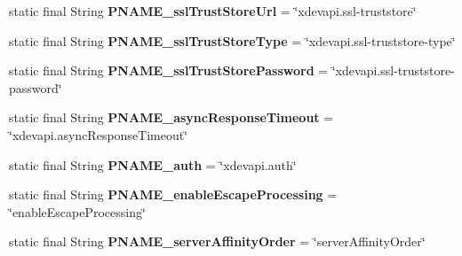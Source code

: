 \begin{DoxyCompactItemize}
static final String {\bfseries P\+N\+A\+M\+E\+\_\+ssl\+Trust\+Store\+Url} = \char`\"{}xdevapi.\+ssl-\/truststore\char`\"{}
\item 
\mbox{\label{classcom_1_1mysql_1_1cj_1_1conf_1_1_property_definitions_a1d4510674aaec9a522a0d45b6579f73d}} 
static final String {\bfseries P\+N\+A\+M\+E\+\_\+ssl\+Trust\+Store\+Type} = \char`\"{}xdevapi.\+ssl-\/truststore-\/type\char`\"{}
\item 
\mbox{\label{classcom_1_1mysql_1_1cj_1_1conf_1_1_property_definitions_a87623840b4eec648043fe571b884400e}} 
static final String {\bfseries P\+N\+A\+M\+E\+\_\+ssl\+Trust\+Store\+Password} = \char`\"{}xdevapi.\+ssl-\/truststore-\/password\char`\"{}
\item 
\mbox{\label{classcom_1_1mysql_1_1cj_1_1conf_1_1_property_definitions_abcca298bb61529133c71710af0003312}} 
static final String {\bfseries P\+N\+A\+M\+E\+\_\+async\+Response\+Timeout} = \char`\"{}xdevapi.\+async\+Response\+Timeout\char`\"{}
\item 
\mbox{\label{classcom_1_1mysql_1_1cj_1_1conf_1_1_property_definitions_a83d450000d4a5e1f09170bba7f42a947}} 
static final String {\bfseries P\+N\+A\+M\+E\+\_\+auth} = \char`\"{}xdevapi.\+auth\char`\"{}
\item 
\mbox{\label{classcom_1_1mysql_1_1cj_1_1conf_1_1_property_definitions_a361775e4e4329fdfd54237feea4ea992}} 
static final String {\bfseries P\+N\+A\+M\+E\+\_\+enable\+Escape\+Processing} = \char`\"{}enable\+Escape\+Processing\char`\"{}
\item 
\mbox{\label{classcom_1_1mysql_1_1cj_1_1conf_1_1_property_definitions_a6a2da04444737d1684fe2a7211c52ee9}} 
static final String {\bfseries P\+N\+A\+M\+E\+\_\+server\+Affinity\+Order} = \char`\"{}server\+Affinity\+Order\char`\"{}
\item 
\mbox{\label{classcom_1_1mysql_1_1cj_1_1conf_1_1_property_definitions_ab87de3c03200eb2a5cc084b3962690f9}} 

\end{DoxyCompactItemize}
